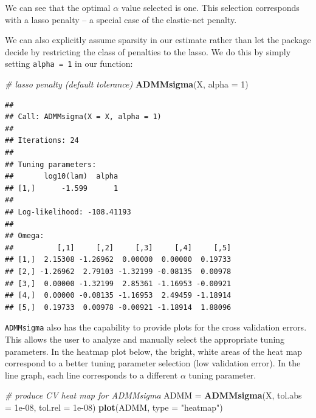 \documentclass[11pt,]{report}
\newenvironment{Shaded}{\begin{snugshade}}{\end{snugshade}}
\newcommand{\CommentTok}[1]{\textcolor[rgb]{0.56,0.35,0.01}{\textit{#1}}}
\newcommand{\DataTypeTok}[1]{\textcolor[rgb]{0.13,0.29,0.53}{#1}}
\newcommand{\DecValTok}[1]{\textcolor[rgb]{0.00,0.00,0.81}{#1}}
\newcommand{\FloatTok}[1]{\textcolor[rgb]{0.00,0.00,0.81}{#1}}
\newcommand{\KeywordTok}[1]{\textcolor[rgb]{0.13,0.29,0.53}{\textbf{#1}}}
\newcommand{\NormalTok}[1]{#1}
\newcommand{\StringTok}[1]{\textcolor[rgb]{0.31,0.60,0.02}{#1}}
\theoremstyle{definition}
\theoremstyle{definition}
\theoremstyle{definition}
\theoremstyle{remark}
\begin{document}
\vspace{0.5cm}

We can see that the optimal \(\alpha\) value selected is one. This selection corresponds with a lasso penalty -- a special case of the elastic-net penalty.

We can also explicitly assume sparsity in our estimate rather than let the package decide by restricting the class of penalties to the lasso. We do this by simply setting \texttt{alpha\ =\ 1} in our function:

\vspace{0.5cm}

\begin{Shaded}
\begin{Highlighting}[]
\CommentTok{# lasso penalty (default tolerance)}
\KeywordTok{ADMMsigma}\NormalTok{(X, }\DataTypeTok{alpha =} \DecValTok{1}\NormalTok{)}
\end{Highlighting}
\end{Shaded}

\begin{verbatim}
## 
## Call: ADMMsigma(X = X, alpha = 1)
## 
## Iterations: 24
## 
## Tuning parameters:
##       log10(lam)  alpha
## [1,]      -1.599      1
## 
## Log-likelihood: -108.41193
## 
## Omega:
##          [,1]     [,2]     [,3]     [,4]     [,5]
## [1,]  2.15308 -1.26962  0.00000  0.00000  0.19733
## [2,] -1.26962  2.79103 -1.32199 -0.08135  0.00978
## [3,]  0.00000 -1.32199  2.85361 -1.16953 -0.00921
## [4,]  0.00000 -0.08135 -1.16953  2.49459 -1.18914
## [5,]  0.19733  0.00978 -0.00921 -1.18914  1.88096
\end{verbatim}

\vspace{0.5cm}

\texttt{ADMMsigma} also has the capability to provide plots for the cross validation errors. This allows the user to analyze and manually select the appropriate tuning parameters. In the heatmap plot below, the bright, white areas of the heat map correspond to a better tuning parameter selection (low validation error). In the line graph, each line corresponds to a different \(\alpha\) tuning parameter.

\vspace{0.5cm}

\begin{Shaded}
\begin{Highlighting}[]
\CommentTok{# produce CV heat map for ADMMsigma}
\NormalTok{ADMM =}\StringTok{ }\KeywordTok{ADMMsigma}\NormalTok{(X, }\DataTypeTok{tol.abs =} \FloatTok{1e-08}\NormalTok{, }\DataTypeTok{tol.rel =} \FloatTok{1e-08}\NormalTok{)}
\KeywordTok{plot}\NormalTok{(ADMM, }\DataTypeTok{type =} \StringTok{"heatmap"}\NormalTok{)}
\end{Highlighting}
\end{Shaded}
\end{document}
